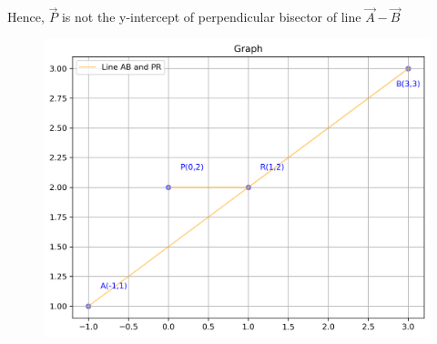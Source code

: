 \documentclass[journal]{IEEEtran}
\begin{document}
Hence, $\vec{P}$ is not the y-intercept of perpendicular bisector of line $\vec{A}-\vec{B}$
\newpage
\begin{figure}[H]
    \centering
    \includegraphics[width=\columnwidth]{figs/figure.png}
    \caption{}
    \label{fig:placeholder}
\end{figure}
\end{document}
